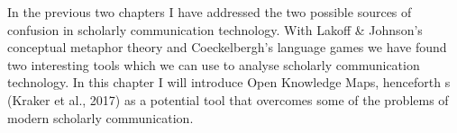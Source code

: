 In the previous two chapters I have addressed the two possible sources of confusion in scholarly communication technology. With Lakoff & Johnson’s conceptual metaphor theory and Coeckelbergh’s language games we have found two interesting tools which we can use to analyse scholarly communication technology. In this chapter I will introduce Open Knowledge Maps, henceforth s (Kraker et al., 2017) as a potential tool that overcomes some of the problems of modern scholarly communication.